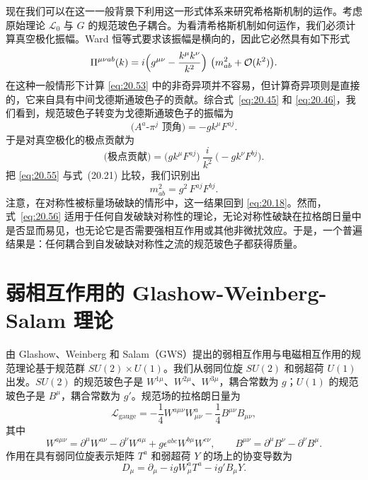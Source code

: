 现在我们可以在这一一般背景下利用这一形式体系来研究希格斯机制的运作。考虑原始理论 $\mathcal{L}_0$ 与 $G$ 的规范玻色子耦合。为看清希格斯机制如何运作，我们必须计算真空极化振幅。Ward 恒等式要求该振幅是横向的，因此它必然具有如下形式
\begin{equation}
  \Pi^{\mu\nu ab}(k) = i\Bigl( g^{\mu\nu} - \frac{k^\mu k^\nu}{k^2}
    \Bigr)\ \bigl( m^2_{ab} + \mathcal{O}(k^2) \bigr) .
  \label{eq:20.53}
\end{equation}
在这种一般情形下计算 \eqref{eq:20.53} 中的非奇异项并不容易，但计算奇异项则是直接的，它来自具有中间戈德斯通玻色子的贡献。综合式~\eqref{eq:20.45} 和 \eqref{eq:20.46}，我们看到，规范玻色子转变为戈德斯通玻色子的振幅为
\begin{equation}
  \text{($A^a$-$\pi^j$ 顶角)} = -g k^\mu F^{aj} .
  \label{eq:20.54}
\end{equation}
于是对真空极化的极点贡献为
\begin{equation}
  \text{(极点贡献)} = \bigl( gk^\mu F^{aj} \bigr)\
    \frac{i}{k^2}\ \bigl( -gk^\nu F^{bj} \bigr) .
  \label{eq:20.55}
\end{equation}
把 \eqref{eq:20.55} 与式~(20.21) 比较，我们识别出
\begin{equation}
  m^2_{ab} = g^2\,F^{aj}F^{bj} .
  \label{eq:20.56}
\end{equation}
注意，在对称性被标量场破缺的情形中，这一结果回到 \eqref{eq:20.18}。然而，式~\eqref{eq:20.56} 适用于任何自发破缺对称性的理论，无论对称性破缺在拉格朗日量中是否显而易见，也无论它是否需要强相互作用或其他非微扰效应。于是，一个普遍结果是：任何耦合到自发破缺对称性之流的规范玻色子都获得质量。

\section{弱相互作用的 Glashow-Weinberg-Salam 理论}

由 Glashow、Weinberg 和 Salam（GWS）提出的弱相互作用与电磁相互作用的规范理论基于规范群 $SU(2)\times U(1)$。我们从弱同位旋 $SU(2)$ 和弱超荷 $U(1)$ 出发。$SU(2)$ 的规范玻色子是 $W^{1\mu}$、$W^{2\mu}$、$W^{3\mu}$，耦合常数为 $g$；$U(1)$ 的规范玻色子是 $B^\mu$，耦合常数为 $g'$。规范场的拉格朗日量为
\begin{equation}
  \mathcal{L}_{\mathrm{gauge}} = -\frac{1}{4}W^{a\mu\nu}W^a_{\mu\nu}
    - \frac{1}{4}B^{\mu\nu}B_{\mu\nu} ,
  \label{eq:20.58}
\end{equation}
其中
\begin{equation}
  W^{a\mu\nu} = \partial^\mu W^{a\nu} - \partial^\nu W^{a\mu}
    + g\epsilon^{abc}W^{b\mu}W^{c\nu},\qquad
  B^{\mu\nu} = \partial^\mu B^\nu - \partial^\nu B^\mu .
\end{equation}
作用在具有弱同位旋表示矩阵 $T^a$ 和弱超荷 $Y$ 的场上的协变导数为
\begin{equation}
  D_\mu = \partial_\mu - igW^a_\mu T^a - ig'B_\mu Y .
  \label{eq:20.65}
\end{equation}

